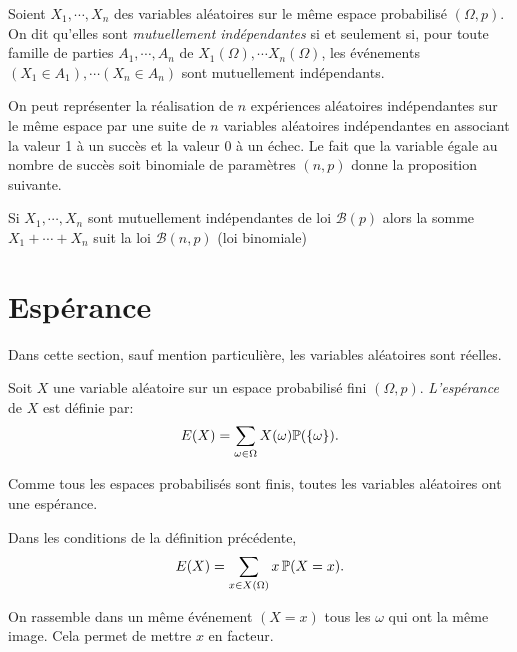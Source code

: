\newpage
{}
\begin{defi}
 Soient $X_1,\cdots, X_n$ des variables aléatoires sur le même espace probabilisé $(\Omega,p)$. On dit qu'elles sont \emph{mutuellement indépendantes} si et seulement si, pour toute famille de parties $A_1,\cdots,A_n$ de $X_1(\Omega),\cdots X_n(\Omega)$, les événements $(X_1\in A_1), \cdots (X_n\in A_n)$ sont mutuellement indépendants.
\end{defi}
On peut représenter la réalisation de $n$ expériences aléatoires indépendantes sur le même espace par une suite de $n$ variables aléatoires indépendantes en associant la valeur 1 à un succès et la valeur 0 à un échec. Le fait que la variable égale au nombre de succès soit binomiale de paramètres $(n,p)$ donne la proposition suivante.
\begin{prop}
 Si $X_1, \cdots, X_n$ sont mutuellement indépendantes de loi $\mathcal{B}(p)$ alors la somme $X_1+\cdots+X_n$ suit la loi $\mathcal{B}(n,p)$ (loi binomiale)
\end{prop}
\newpage
\section{Espérance}
 Dans cette section, sauf mention particulière, les variables aléatoires sont réelles.
\begin{defi}
 Soit $X$ une variable aléatoire sur un espace probabilisé fini $(\Omega,p)$. \emph{L'espérance} de $X$ est définie par:
\begin{displaymath}
 E(X) = \sum_{\omega \in \Omega}X(\omega)\mathbb{P}(\{\omega\}). 
\end{displaymath}
\end{defi}
\begin{rem}
  Comme tous les espaces probabilisés sont finis, toutes les variables aléatoires ont une espérance.
\end{rem}

\begin{prop} Dans les conditions de la définition précédente,
\[
 E(X) = \sum_{x\in X(\Omega)}x\,\mathbb{P}(X=x).
\]
\end{prop}
\begin{demo}
 On rassemble dans un même événement $(X=x)$ tous les $\omega$ qui ont la même image. Cela permet de mettre $x$ en facteur.
\end{demo}

